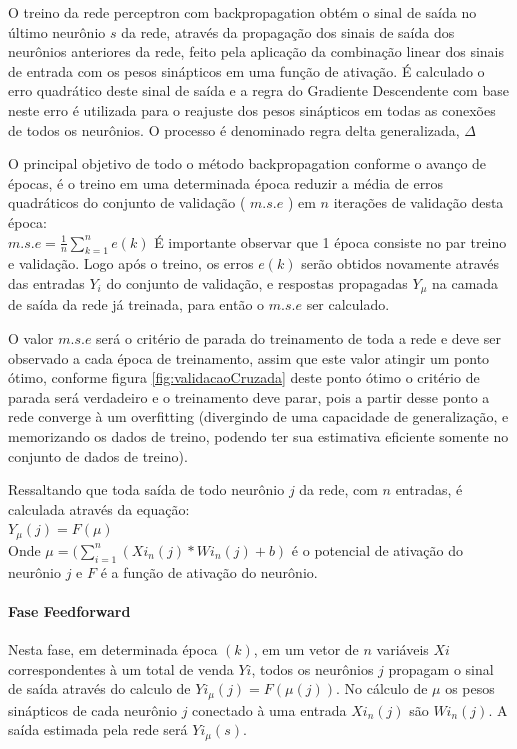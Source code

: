 \documentclass[	12pt, Times, openright, twoside, a4paper, english, brazil]{abntex2}
\begin{document}
            O treino da rede perceptron com backpropagation obtém o sinal de saída no último neurônio $s$ da rede, através da propagação dos sinais de saída dos neurônios anteriores da rede, feito pela aplicação da combinação linear dos sinais de entrada com os pesos sinápticos em uma função de ativação. É calculado o erro quadrático deste sinal de saída e a regra do Gradiente Descendente com base neste erro é utilizada para o reajuste dos pesos sinápticos em todas as conexões de todos os neurônios. O processo é denominado regra delta generalizada, $\Delta$
            
            O principal objetivo de todo o método backpropagation conforme o avanço de épocas, é o treino em uma determinada época reduzir a média de erros quadráticos do conjunto de validação ( $m.s.e$ ) em $n$ iterações de validação desta época:\\
            $m.s.e = \frac{1}{n} \sum_{k=1}^{n}e(k)$
            É importante observar que 1 época consiste no par treino e validação. Logo após o treino, os erros $e(k)$ serão obtidos novamente através das entradas $Y_i$ do conjunto de validação, e respostas propagadas $Y_\mu$ na camada de saída da rede já treinada, para então o $m.s.e$ ser calculado.
            
            O valor $m.s.e$ será o critério de parada do treinamento de toda a rede e deve ser observado a cada época de treinamento, assim que este valor atingir um ponto ótimo, conforme figura \ref{fig:validacaoCruzada} deste ponto ótimo o critério de parada será verdadeiro e o treinamento deve parar, pois a partir desse ponto a rede converge à um overfitting (divergindo de uma capacidade de generalização, e memorizando os dados de treino, podendo ter sua estimativa eficiente somente no conjunto de dados de treino).
            
            Ressaltando que toda saída de todo neurônio $j$ da rede, com $n$ entradas, é calculada através da equação:\\
            $ Y_{\mu}(j) = F(\mu)$\\
            Onde $\mu = (\sum_{i=1}^{n} (Xi_{n}(j)*Wi_{n}(j) + b)$ é o potencial de ativação do neurônio $j$ e $F$ é a função de ativação do neurônio.
            
           \paragraph*{Fase Feedforward}
            Nesta fase, em determinada época $(k)$, em um vetor de $n$ variáveis $Xi$ correspondentes à um total de venda $Yi$, todos os neurônios $j$ propagam o sinal de saída através do calculo de $Yi_{\mu}(j) = F(\mu(j))$. No cálculo de $\mu$ os pesos sinápticos de cada neurônio $j$ conectado à uma entrada $Xi_{n}(j)$ são $Wi_{n}(j)$. A saída estimada pela rede será $Yi_{\mu}(s)$.
            
\end{document}

